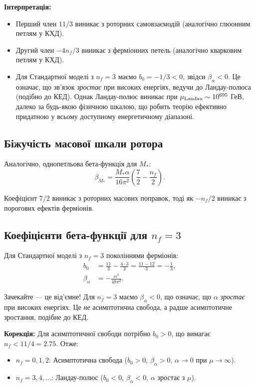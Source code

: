 \documentclass[11pt,a4paper]{article}
\numberwithin{equation}{section}
\theoremstyle{plain}
\theoremstyle{definition}
\theoremstyle{remark}
\begin{document}
\textbf{Інтерпретація:}
\begin{itemize}
  \item Перший член $11/3$ виникає з роторних самовзаємодій (аналогічно глюонним петлям у КХД).
  \item Другий член $-4n_f/3$ виникає з ферміонних петель (аналогічно кварковим петлям у КХД).
  \item Для Стандартної моделі з $n_f=3$ маємо $b_0 = -1/3 < 0$, звідси $\beta_\alpha < 0$. Це означає, що зв'язок \emph{зростає} при високих енергіях, ведучи до Ландау-полюса (подібно до КЕД). Однак Ландау-полюс виникає при $\mu_{\rm Landau} \sim 10^{695}$ ГеВ, далеко за будь-якою фізичною шкалою, що робить теорію ефективно придатною у всьому доступному енергетичному діапазоні.
\end{itemize}

\subsection{Біжучість масової шкали ротора}

Аналогічно, однопетльова бета-функція для $M_*$:
\begin{equation}
\beta_{M_*} = \frac{M_*\alpha}{16\pi^2}\left(\frac{7}{2} - \frac{n_f}{2}\right).
\label{eq:beta-M-1loop-final}
\end{equation}

Коефіцієнт $7/2$ виникає з роторних масових поправок, тоді як $-n_f/2$ виникає з порогових ефектів ферміонів.

\subsection{Коефіцієнти бета-функції для $n_f=3$}

Для Стандартної моделі з $n_f=3$ поколіннями ферміонів:
\begin{align}
b_0 &= \frac{11}{3} - \frac{4\cdot 3}{3} = \frac{11-12}{3} = -\frac{1}{3}, \label{eq:b0-nf3}\\
\beta_\alpha &= -\frac{\alpha^2}{48\pi^2}. \label{eq:beta-alpha-nf3}
\end{align}

Зачекайте — це від'ємне! Для $n_f=3$ маємо $\beta_\alpha<0$, що означає, що $\alpha$ \emph{зростає} при високих енергіях. Це \emph{не} асимптотична свобода, а радше асимптотичне зростання, подібне до КЕД.

\textbf{Корекція:} Для асимптотичної свободи потрібно $b_0 > 0$, що вимагає $n_f < 11/4 = 2.75$. Отже:
\begin{itemize}
  \item $n_f=0,1,2$: Асимптотична свобода ($b_0>0$, $\beta_\alpha>0$, $\alpha\to 0$ при $\mu\to\infty$).
  \item $n_f=3,4,\ldots$: Ландау-полюс ($b_0<0$, $\beta_\alpha<0$, $\alpha$ зростає з $\mu$).
\end{itemize}
\end{document}
